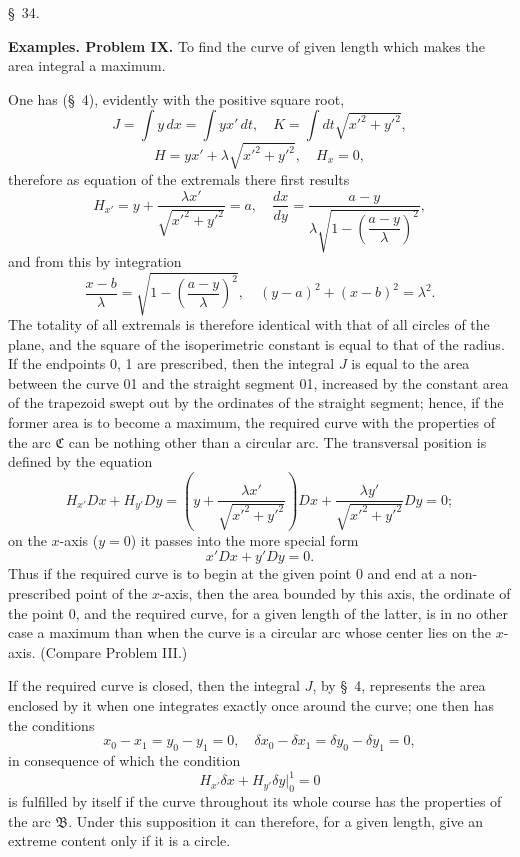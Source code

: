 \documentclass[11pt,a4paper,leqno]{article}
\begin{document}
\begin{center}{\large \S~34.}\end{center}

\noindent\textbf{Examples. Problem IX.} To find the curve of given length which makes the area integral a maximum.

One has (\S~4), evidently with the positive square root,
\[
J=\int y\,dx=\int yx'\,dt,
\quad
K=\int dt\sqrt{x'^2+y'^2},
\]
\[
H=yx'+\lambda\sqrt{x'^2+y'^2},
\quad
H_x=0,
\]
therefore as equation of the extremals there first results
\begin{equation}\tag{5}
H_{x'}=y+\frac{\lambda x'}{\sqrt{x'^2+y'^2}}=a,
\quad
\frac{dx}{dy}=\frac{a-y}{\lambda\sqrt{1-\left(\dfrac{a-y}{\lambda}\right)^2}},
\end{equation}
and from this by integration
\[
\frac{x-b}{\lambda}=\sqrt{1-\left(\frac{a-y}{\lambda}\right)^2},
\quad
(y-a)^2+(x-b)^2=\lambda^2.
\]
The totality of all extremals is therefore identical with that of all circles of the plane, and the square of the isoperimetric constant is equal to that of the radius. If the endpoints 0, 1 are prescribed, then the integral $J$ is equal to the area between the curve 01 and the straight segment 01, increased by the constant area of the trapezoid swept out by the ordinates of the straight segment; hence, if the former area is to become a maximum, the required curve with the properties of the arc $\mathfrak{C}$ can be nothing other than a circular arc. The transversal position is defined by the equation
\[
H_{x'}Dx+H_{y'}Dy=
\left(y+\frac{\lambda x'}{\sqrt{x'^2+y'^2}}\right)Dx+
\frac{\lambda y'}{\sqrt{x'^2+y'^2}}Dy=0;
\]
on the $x$-axis ($y=0$) it passes into the more special form
\[
x'Dx+y'Dy=0.
\]
Thus if the required curve is to begin at the given point 0 and end at a non-prescribed point of the $x$-axis, then the area bounded by this axis, the ordinate of the point 0, and the required curve, for a given length of the latter, is in no other case a maximum than when the curve is a circular arc whose center lies on the $x$-axis. (Compare Problem III.)

If the required curve is closed, then the integral $J$, by \S~4, represents the area enclosed by it when one integrates exactly once around the curve; one then has the conditions
\[
x_0-x_1=y_0-y_1=0,
\quad
\delta x_0-\delta x_1=\delta y_0-\delta y_1=0,
\]
in consequence of which the condition
\[
H_{x'}\delta x+H_{y'}\delta y\bigg|_0^1=0
\]
is fulfilled by itself if the curve throughout its whole course has the properties of the arc $\mathfrak{B}$. Under this supposition it can therefore, for a given length, give an extreme content only if it is a circle.
\end{document}
